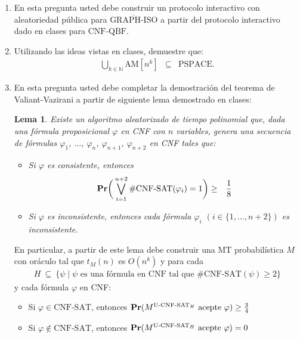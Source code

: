 \documentclass[10pt]{article}
\newcommand{\vs}[1]{\vspace{#1mm}}
\newcommand{\pspace}{\text{PSPACE}}
\newcommand{\cnf}{\text{CNF-SAT}}
\newcommand{\GRAPHISO}{\text{GRAPH-ISO}}
\newcommand{\cqbf}{\text{CNF-QBF}}
\newcommand{\am}{\text{AM}}
\newtheorem{lema}{Lema}
\newcommand{\pr}{\text{\rm {\bf Pr}}}
\newcommand{\scnf}{\#\text{CNF-SAT}}
\newcommand{\ucnf}{\text{U-CNF-SAT}}
\begin{document}
\begin{enumerate}
\item En esta pregunta usted debe construir un protocolo interactivo
  con aleatoriedad pública para $\overline{\GRAPHISO}$ a partir del
  protocolo interactivo dado en clases para $\cqbf$.

\item Utilizando las ideas vistas en clases, demuestre que:
  \begin{eqnarray*}
    \bigcup_{k \in \mathbb{N}} \am[n^k] & \subseteq & \pspace.
  \end{eqnarray*}


\item En esta pregunta usted debe completar la demostración del
  teorema de Valiant-Vazirani a partir de siguiente lema demostrado
  en clases:
\begin{lema}
Existe un algoritmo aleatorizado de tiempo polinomial que, dada una
fórmula proposicional $\varphi$ en CNF con $n$ variables, genera una secuencia de
fórmulas $\varphi_1$, $\ldots$, $\varphi_n$, $\varphi_{n+1}$, $\varphi_{n+2}$ en CNF tales que:
\begin{itemize}
\item Si $\varphi$ es consistente, entonces
\begin{eqnarray*}
\pr\bigg(\bigvee_{i=1}^{n+2} \scnf(\varphi_i) = 1\bigg) & \geq & \frac{1}{8}
\end{eqnarray*}

\item Si $\varphi$ es inconsistente, entonces cada fórmula $\varphi_i$ $(i \in \{1, \ldots, n+2\})$ es inconsistente.
\end{itemize}
\end{lema}
En particular, a partir de este lema debe construir una MT probabilística $M$ con oráculo tal que $t_M(n)$ es $O(n^k)$ y para cada
  \begin{align*}
    H \ \subseteq \ \{ \psi \mid \psi \text{ es una fórmula en CNF tal que } \scnf(\psi) \geq 2\}
  \end{align*}
  y cada fórmula $\varphi$ en CNF:
\vs{1}
  \begin{itemize}
\item Si $\varphi \in \cnf$, entonces $\pr(M^{\ucnf_H} \text{ acepte } \varphi) \geq \frac{3}{4}$
\vs{1}
\item Si $\varphi \not\in \cnf$, entonces $\pr(M^{\ucnf_H} \text{ acepte } \varphi) = 0$
\end{itemize}
\end{enumerate}
\end{document}
